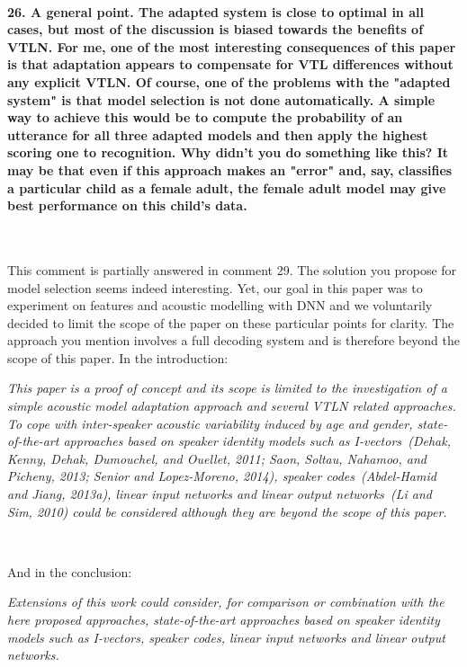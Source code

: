 \documentclass[]{article}
\begin{document}
\paragraph{26. A general point. The adapted system is close to optimal in all cases, but most of the discussion is biased towards the benefits of VTLN. For me, one of the most interesting consequences of this paper is that adaptation appears to compensate for VTL differences without any explicit VTLN. Of course, one of the problems with the "adapted system" is that model selection is not done automatically. A simple way to achieve this would be to compute the probability of an utterance for all three adapted models and then apply the highest scoring one to recognition. Why didn't you do something like this? It may be that even if this approach makes an "error" and, say, classifies a particular child as a female adult, the female adult model may give best performance on this child's data.}

~

This comment is partially answered in comment 29. The solution you propose for model selection seems indeed interesting. Yet, our goal in this paper was to experiment on features and acoustic modelling with DNN and we voluntarily decided to limit the scope of the paper on these particular points for clarity. The approach you mention involves a full decoding system and is therefore beyond the scope of this paper. In the introduction:

%

\textit{This  paper is a  proof of  concept and  its scope  is limited  to the investigation  of  a simple acoustic  model  adaptation approach and several VTLN related  approaches.  To cope with inter-speaker acoustic variability induced by age and gender, state-of-the-art approaches based on speaker identity models such as I-vectors~(Dehak, Kenny, Dehak, Dumouchel, and Ouellet, 2011; Saon, Soltau, Nahamoo, and Picheny, 2013; Senior and Lopez-Moreno, 2014),  speaker codes~(Abdel-Hamid and Jiang, 2013a),  linear input networks  and  linear  output  networks~(Li and Sim, 2010) could be considered although they are beyond the scope of this paper.}

~

And in the conclusion:

\textit{Extensions   of  this   work  could   consider,  for   comparison  or
combination  with  the  here  proposed  approaches,  state-of-the-art
approaches based on speaker identity models such as I-vectors,  speaker codes,  linear input
networks  and  linear  output  networks.}
\end{document}
